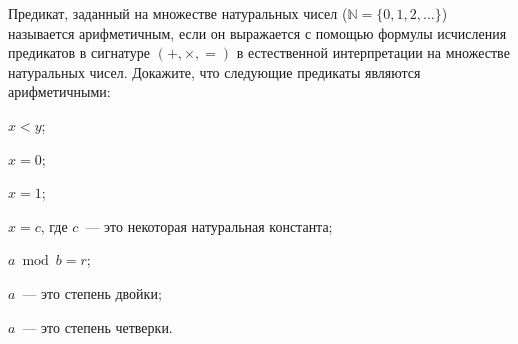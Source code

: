Предикат, заданный на множестве натуральных чисел ($\mathbb{N} = \{0, 1, 2, \dots\}$) называется арифметичным, если он
выражается с помощью формулы исчисления предикатов в сигнатуре $(+, \times, =)$ в естественной интерпретации на множестве
натуральных чисел. Докажите, что следующие предикаты являются арифметичными:
\begin{enumcyr}
    \item $x < y$;
    \item $x = 0$;
    \item $x = 1$;
    \item $x = c$, где $c$~--- это некоторая натуральная константа;
    \item $a \bmod b = r$;
    \item $a$~--- это степень двойки;
    \item $a$~--- это степень четверки.
\end{enumcyr}